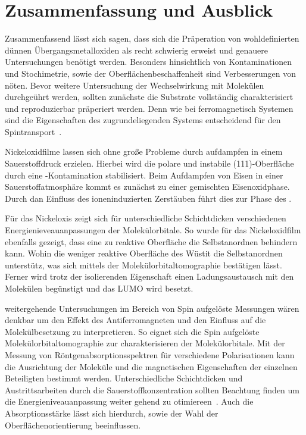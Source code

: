 \chapter{Zusammenfassung und Ausblick}
    Zusammenfassend lässt sich sagen, dass sich die Präperation von wohldefinierten dünnen Übergangsmetalloxiden als recht schwierig erweist und genauere Untersuchungen benötigt werden.
    Besonders hinsichtlich von Kontaminationen und Stochimetrie, sowie der Oberflächenbeschaffenheit sind Verbesserungen von nöten.
    Bevor weitere Untersuchung der Wechselwirkung mit Molekülen durchgeührt werden, sollten zunächste die Substrate vollständig charakterisiert und reproduzierbar präperiert werden.
    Denn wie bei ferromagnetisch Systemen sind die Eigenschaften des zugrundeliegenden Systems entscheidend für den Spintransport~\cite{IF_16}.

    Nickeloxidfilme lassen sich ohne große Probleme durch aufdampfen in einem Sauerstoffdruck erzielen.
    Hierbei wird die polare und instabile (111)-Oberfläche durch eine -Kontamination stabilisiert.
    Beim Aufdampfen von Eisen in einer Sauerstoffatmosphäre kommt es zunächst zu einer gemischten Eisenoxidphase.
    Durch dan Einfluss des ioneninduzierten Zerstäuben führt dies zur Phase des .
    
    Für das Nickeloxis zeigt sich für unterschiedliche Schichtdicken verschiedenen Energienieveauanpassungen der Molekülorbitale.
    So wurde für das Nickeloxidfilm ebenfalls gezeigt, dass eine zu reaktive Oberfläche die Selbstanordnen behindern kann.
    Wohin die weniger reaktive Oberfläche des Wüstit die Selbstanordnen unterstütz, was sich mittels der Molekülorbitaltomographie bestätigen lässt.
    Ferner wird trotz der isolierenden Eigenschaft einen Ladungsaustausch mit den Molekülen begünstigt und das LUMO wird besetzt.

    weitergehende Untersuchungen im Bereich von Spin aufgelöste Messungen wären denkbar um den Effekt des Antiferromagneten und den Einfluss auf die Molekülbesetzung zu interpretieren.
    So eignet sich die Spin aufgelöste Molekülorbitaltomographie zur charakterisieren der Molekülorbitale.
    Mit der Messung von Röntgenabsorptionsspektren für verschiedene Polarisationen kann die Ausrichtung der Moleküle und die magnetischen Eigenschaften der einzelnen Beteiligten bestimmt werden.
    Unterschiedliche Schichtdicken und Austrittsarbeiten durch die Sauerstoffkonzentration sollten Beachtung finden um die Energieniveauanpassung weiter gehend zu otimiereen~\cite{IF_8}.
    Auch die Absorptionsstärke lässt sich hierdurch, sowie der Wahl der Oberflächenorientierung beeinflussen.
